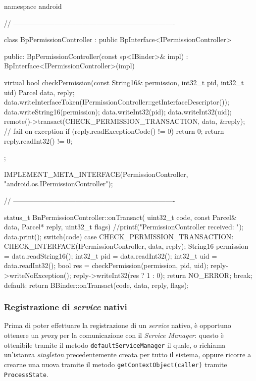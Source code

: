\begin{algorithm}[thp]
\begin{cpp}[caption=$ $IPermissionController.cpp,label=alg:ipcontrol]
namespace android {

// ----------------------------------------------------------------------

class BpPermissionController : public BpInterface<IPermissionController>
{
public:
    BpPermissionController(const sp<IBinder>& impl)
        : BpInterface<IPermissionController>(impl)
    {
    }

    virtual bool checkPermission(const String16& permission, int32_t pid, int32_t uid)
    {
        Parcel data, reply;
        data.writeInterfaceToken(IPermissionController::getInterfaceDescriptor());
        data.writeString16(permission);
        data.writeInt32(pid);
        data.writeInt32(uid);
        remote()->transact(CHECK_PERMISSION_TRANSACTION, data, &reply);
        // fail on exception
        if (reply.readExceptionCode() != 0) return 0;
        return reply.readInt32() != 0;
    }
};

IMPLEMENT_META_INTERFACE(PermissionController, "android.os.IPermissionController");

// ----------------------------------------------------------------------

status_t BnPermissionController::onTransact(
    uint32_t code, const Parcel& data, Parcel* reply, uint32_t flags)
{
    //printf("PermissionController received: "); data.print();
    switch(code) {
        case CHECK_PERMISSION_TRANSACTION: {
            CHECK_INTERFACE(IPermissionController, data, reply);
            String16 permission = data.readString16();
            int32_t pid = data.readInt32();
            int32_t uid = data.readInt32();
            bool res = checkPermission(permission, pid, uid);
            reply->writeNoException();
            reply->writeInt32(res ? 1 : 0);
            return NO_ERROR;
        } break;
        default:
            return BBinder::onTransact(code, data, reply, flags);
    }
}

}
\end{cpp}
\end{algorithm}



\subsubsection{Registrazione di \textit{service} nativi}\label{subsub:regservicenative}
Prima di poter effettuare la registrazione di un \textit{service} nativo, è 
opportuno ottenere un \textit{proxy} per la comunicazione con il \textit{Service Manager}:
questo è ottenibile tramite il metodo \texttt{\small defaultServiceManager} il quale,
o richiama un'istanza \textit{singleton} precedentemente creata per tutto il sistema,
oppure ricorre a crearne una nuova tramite il metodo \texttt{\small getContextObject(caller)}
tramite \texttt{\small ProcessState}.


